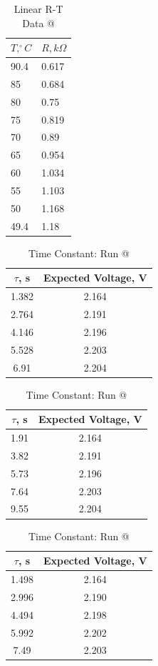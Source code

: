 \documentclass[a4,11pt]{article}
\makeatletter
\newcommand*{\rom}[1]{\expandafter\@slowromancap\romannumeral #1@}
\makeatother
\begin{document}
\begin{table}[H]
	\centering
	\caption{Linear R-T Data \rom{3}}
	\begin{tabular}{l|l}
		\hline
		$T, ^{\circ}C$ & $R, k\Omega$ \\
		\hline
		90.4 & 0.617  \\
		85 & 0.684  \\
		80 & 0.75  \\
		75 & 0.819  \\
		70 & 0.89  \\
		65 & 0.954  \\
		60 & 1.034  \\
		55 & 1.103  \\
		50 & 1.168  \\
		49.4 & 1.18  \\
		\hline
	\end{tabular}
\end{table}
\begin{table}[H]
	\centering
	\caption{Time Constant: Run \rom{1}}
	\label{const1}
	\begin{tabular}{c|c}
		$\tau$, s  &  Expected Voltage, V \\
		\hline
		1.382 &  2.164 \\
		2.764 &  2.191 \\
		4.146 & 2.196 \\
		5.528 & 2.203 \\
		6.91 & 2.204 \\
	\end{tabular}
\end{table}
\begin{table}[H]
	\centering
	\caption{Time Constant: Run \rom{2}}
	\label{const2}
	\begin{tabular}{c|c}
		$\tau$, s  &  Expected Voltage, V \\
		\hline
		1.91 &  2.164 \\
		3.82 &  2.191 \\
		5.73 & 2.196 \\
		7.64 & 2.203 \\
		9.55 & 2.204 \\
	\end{tabular}
\end{table}
\begin{table}[H]
	\centering
	\caption{Time Constant: Run \rom{3}}
	\label{const3}
	\begin{tabular}{c|c}
		$\tau$, s  &  Expected Voltage, V \\
		\hline
		1.498 &  2.164 \\
		2.996 &  2.190 \\
		4.494 & 2.198 \\
		5.992 & 2.202 \\
		7.49 & 2.203 \\
	\end{tabular}
\end{table}
\end{document}
